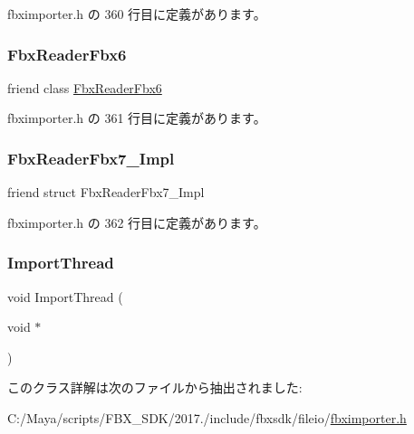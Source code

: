  fbximporter.\+h の 360 行目に定義があります。

\mbox{\label{class_fbx_importer_a7f8cca9f018e4d952710060c08cc3983}} 
\subsubsection{\texorpdfstring{Fbx\+Reader\+Fbx6}{FbxReaderFbx6}}
{\footnotesize\ttfamily friend class \hyperlink{class_fbx_reader_fbx6}{Fbx\+Reader\+Fbx6}\hspace{0.3cm}{\ttfamily [friend]}}



 fbximporter.\+h の 361 行目に定義があります。

\mbox{\label{class_fbx_importer_a825b5c450dc04c4042a16fa36d3641c3}} 
\subsubsection{\texorpdfstring{Fbx\+Reader\+Fbx7\+\_\+\+Impl}{FbxReaderFbx7\_Impl}}
{\footnotesize\ttfamily friend struct Fbx\+Reader\+Fbx7\+\_\+\+Impl\hspace{0.3cm}{\ttfamily [friend]}}



 fbximporter.\+h の 362 行目に定義があります。

\mbox{\label{class_fbx_importer_aa8465892e0c998ae0aa1ddc6e1ee8552}} 
\subsubsection{\texorpdfstring{Import\+Thread}{ImportThread}}
{\footnotesize\ttfamily void Import\+Thread (\begin{DoxyParamCaption}\item[{void $\ast$}]{ }\end{DoxyParamCaption})\hspace{0.3cm}{\ttfamily [friend]}}



このクラス詳解は次のファイルから抽出されました\+:\begin{DoxyCompactItemize}
\item 
C\+:/\+Maya/scripts/\+F\+B\+X\+\_\+\+S\+D\+K/2017./include/fbxsdk/fileio/\hyperlink{fbximporter_8h}{fbximporter.\+h}\end{DoxyCompactItemize}
